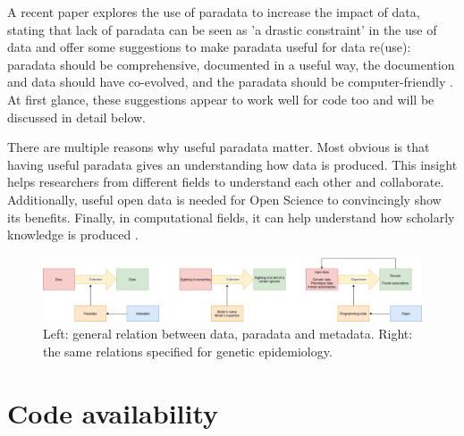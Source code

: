 
A recent paper explores the use of paradata to increase the impact of data,
stating that lack of paradata can be seen as 'a drastic constraint'
in the use of data and offer some suggestions to 
make paradata useful for data re(use):
paradata should be comprehensive, documented in a useful way, 
the documention and data should have co-evolved, 
and the paradata should be computer-friendly \cite{huvila2022improving}.
At first glance, these suggestions appear to work well for code too
and will be discussed in detail below.


There are multiple reasons why useful paradata matter. 
Most obvious is that having useful paradata gives an understanding how
data is produced.
This insight helps researchers from different fields to understand each other
and collaborate.
Additionally, useful open data is needed for Open Science to convincingly show
its benefits.
Finally, in computational fields, 
it can help understand how scholarly knowledge is produced
\cite{huvila2022improving}.

\begin{figure}[!htbp]
  \centering
  \includegraphics[width=\linewidth]{figure_1.png}
  \caption{
    Left: general relation between data, paradata and metadata.
    Right: the same relations specified for genetic epidemiology.
  }
  \label{fig:figure_1}
\end{figure}

\section{Code availability}\label{sec:code-availability}

